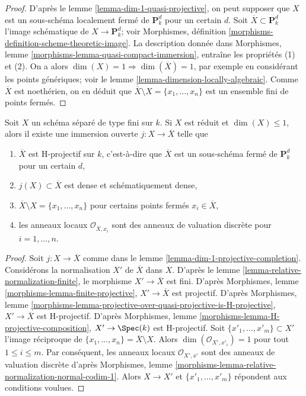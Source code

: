 \begin{proof}
D'après le lemme \ref{lemma-dim-1-quasi-projective}, on peut supposer que $X$ est un
sous-schéma localement fermé de $\mathbf{P}^d_k$ pour un certain $d$. Soit
$\overline{X} \subset \mathbf{P}^d_k$ l'image schématique
de $X \to \mathbf{P}^d_k$; voir Morphismes, définition
\ref{morphisms-definition-scheme-theoretic-image}.
La description donnée dans
Morphismes, lemme \ref{morphisms-lemma-quasi-compact-immersion},
entraîne les propriétés (1) et (2).
On a alors $\dim(X) = 1 \Rightarrow \dim(\overline{X}) = 1$, par exemple en
considérant les points génériques; voir
le lemme \ref{lemma-dimension-locally-algebraic}.
Comme $\overline{X}$ est noethérien, on en déduit que
$\overline{X} \setminus X = \{x_1, \ldots, x_n\}$
est un ensemble fini de points fermés.
\end{proof}

\begin{lemma}
\label{lemma-reduced-dim-1-projective-completion}
Soit $X$ un schéma séparé de type fini sur $k$.
Si $X$ est réduit et $\dim(X) \leq 1$, alors il existe
une immersion ouverte $j : X \to \overline{X}$ telle que
\begin{enumerate}
\item $\overline{X}$ est H-projectif sur $k$, c'est-à-dire que $\overline{X}$
est un sous-schéma fermé de $\mathbf{P}^d_k$ pour un certain $d$,
\item $j(X) \subset \overline{X}$ est dense et schématiquement
dense,
\item $\overline{X} \setminus X = \{x_1, \ldots, x_n\}$
pour certains points fermés $x_i \in \overline{X}$,
\item les anneaux locaux $\mathcal{O}_{\overline{X}, x_i}$
sont des anneaux de valuation discrète pour $i = 1, \ldots, n$.
\end{enumerate}
\end{lemma}

\begin{proof}
Soit $j : X \to \overline{X}$ comme dans le
lemme \ref{lemma-dim-1-projective-completion}.
Considérons la normalisation $X'$ de $\overline{X}$ dans
$X$. D'après le lemme \ref{lemma-relative-normalization-finite},
le morphisme $X' \to \overline{X}$ est fini.
D'après Morphismes, lemme \ref{morphisms-lemma-finite-projective},
$X' \to \overline{X}$ est projectif. D'après Morphismes, lemme
\ref{morphisms-lemma-projective-over-quasi-projective-is-H-projective},
$X' \to \overline{X}$ est H-projectif.
D'après Morphismes, lemme \ref{morphisms-lemma-H-projective-composition},
$X' \to \Spec(k)$ est H-projectif.
Soit $\{x'_1, \ldots, x'_m\} \subset X'$ l'image réciproque
de $\{x_1, \ldots, x_n\} = \overline{X} \setminus X$.
Alors $\dim(\mathcal{O}_{X', x'_i}) = 1$ pour tout $1 \leq i \leq m$.
Par conséquent, les anneaux locaux $\mathcal{O}_{X', x'}$
sont des anneaux de valuation discrète d'après
Morphismes, lemme
\ref{morphisms-lemma-relative-normalization-normal-codim-1}.
Alors $X \to X'$ et $\{x'_1, \ldots, x'_m\}$ répondent aux conditions voulues.
\end{proof}

